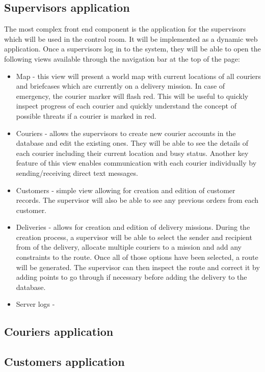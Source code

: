\subsection{Supervisors application} \label{supervisorsarch}
The most complex front end component is the application for the supervisors which will be used in the control room. It will be implemented as a dynamic web application. Once a supervisors log in to the system, they will be able to open the following views available through the navigation bar at the top of the page:
\begin{itemize}
    \item Map - this view will present a world map with current locations of all couriers and briefcases which are currently on a delivery mission. In case of emergency, the courier marker will flash red. This will be useful to quickly inspect progress of each courier and quickly understand the concept of possible threats if a courier is marked in red.
    \item Couriers - allows the supervisors to create new courier accounts in the database and edit the existing ones. They will be able to see the details of each courier including their current location and busy status. Another key feature of this view enables communication with each courier individually by sending/receiving direct text messages.
    \item Customers - simple view allowing for creation and edition of customer records. The supervisor will also be able to see any previous orders from each customer.
    \item Deliveries - allows for creation and edition of delivery missions. During the creation process, a supervisor will be able to select the sender and recipient from of the delivery, allocate multiple couriers to a mission and add any constraints to the route. Once all of those options have been selected, a route will be generated. The supervisor can then inspect the route and correct it by adding points to go through if necessary before adding the delivery to the database.
    \item Server logs - 
\end{itemize}
\subsection{Couriers application} \label{couriersarch}
\subsection{Customers application} \label{customersarch}



